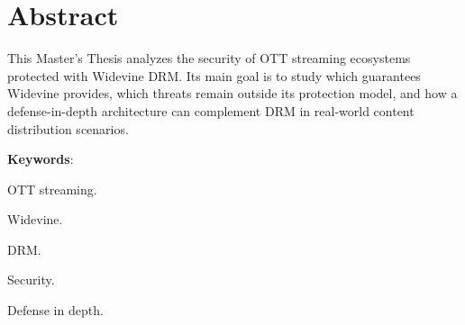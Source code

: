 
\pagestyle{fancy}
\renewcommand{\headrulewidth}{0pt}
\chapter*{Abstract}

This Master's Thesis analyzes the security of OTT streaming ecosystems protected with Widevine DRM. Its main goal is to study which guarantees Widevine provides, which threats remain outside its protection model, and how a defense-in-depth architecture can complement DRM in real-world content distribution scenarios.

\mbox{} \bigskip

\noindent \textbf{Keywords}:
\begin{compactitem}
    \item OTT streaming.
    \item Widevine.
    \item DRM.
    \item Security.
    \item Defense in depth.
\end{compactitem}

\blankpage

